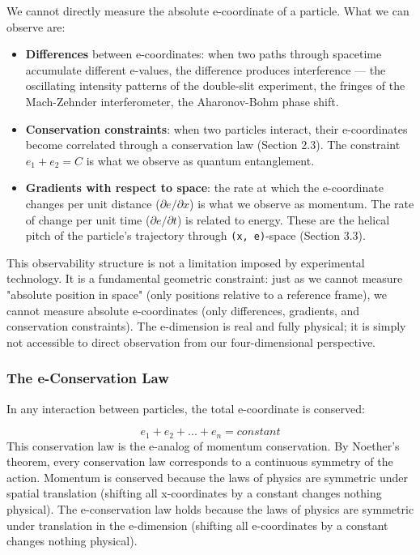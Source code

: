 \documentclass[aps,prd,preprint,superscriptaddress,longbibliography,floatfix]{revtex4-2}
\theoremstyle{remark}
\begin{document}
We cannot directly measure the absolute e-coordinate of a particle. What we can observe are:


\begin{itemize}
  \item \textbf{Differences} between e-coordinates: when two paths through spacetime accumulate different e-values, the difference produces interference --- the oscillating intensity patterns of the double-slit experiment, the fringes of the Mach-Zehnder interferometer, the Aharonov-Bohm phase shift.
  \item \textbf{Conservation constraints}: when two particles interact, their e-coordinates become correlated through a conservation law (Section 2.3). The constraint $e_{1} + e_{2} = C$ is what we observe as quantum entanglement.
  \item \textbf{Gradients with respect to space}: the rate at which the e-coordinate changes per unit distance ($\partial e/\partial x$) is what we observe as momentum. The rate of change per unit time ($\partial e/\partial t$) is related to energy. These are the helical pitch of the particle's trajectory through \texttt{(x, e)}-space (Section 3.3).
\end{itemize}

This observability structure is not a limitation imposed by experimental technology. It is a fundamental geometric constraint: just as we cannot measure "absolute position in space" (only positions relative to a reference frame), we cannot measure absolute e-coordinates (only differences, gradients, and conservation constraints). The e-dimension is real and fully physical; it is simply not accessible to direct observation from our four-dimensional perspective.


\subsubsection{The e-Conservation Law}

In any interaction between particles, the total e-coordinate is conserved:


\begin{equation}
    e_{1} + e_{2} + ... + e_{n} = constant
\end{equation}
This conservation law is the e-analog of momentum conservation. By Noether's theorem, every conservation law corresponds to a continuous symmetry of the action. Momentum is conserved because the laws of physics are symmetric under spatial translation (shifting all x-coordinates by a constant changes nothing physical). The e-conservation law holds because the laws of physics are symmetric under translation in the e-dimension (shifting all e-coordinates by a constant changes nothing physical).
\end{document}
